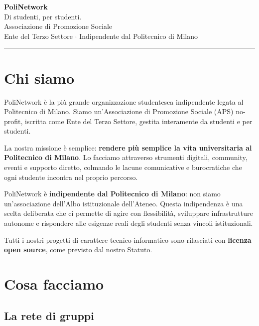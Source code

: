 \documentclass[11pt,a4paper]{article}
\begin{document}
\begin{center}
    {\Huge\bfseries\textcolor{pnblue}{PoliNetwork}}\\[0.5em]
    {\Large\textcolor{pngray}{Di studenti, per studenti.}}\\[1.5em]
    {\large Associazione di Promozione Sociale}\\[0.3em]
    {\normalsize Ente del Terzo Settore $\cdot$ Indipendente dal Politecnico di Milano}\\[2em]
    \rule{0.5\textwidth}{0.5pt}
\end{center}

\vspace{1em}

\section{Chi siamo}

PoliNetwork è la più grande organizzazione studentesca indipendente
legata al Politecnico di Milano. Siamo un'Associazione di Promozione
Sociale (APS) no-profit, iscritta come Ente del Terzo Settore,
gestita interamente da studenti e per studenti.

La nostra missione è semplice: \textbf{rendere più semplice la vita
universitaria al Politecnico di Milano}. Lo facciamo attraverso
strumenti digitali, community, eventi e supporto diretto, colmando
le lacune comunicative e burocratiche che ogni studente incontra nel
proprio percorso.

PoliNetwork è \textbf{indipendente dal Politecnico di Milano}: non
siamo un'associazione dell'Albo istituzionale dell'Ateneo.
Questa indipendenza è una scelta deliberata che ci permette di agire
con flessibilità, sviluppare infrastrutture autonome e rispondere
alle esigenze reali degli studenti senza vincoli istituzionali.

Tutti i nostri progetti di carattere tecnico-informatico sono
rilasciati con \textbf{licenza open source}, come previsto dal
nostro Statuto.

\section{Cosa facciamo}

\subsection{La rete di gruppi}
\end{document}
